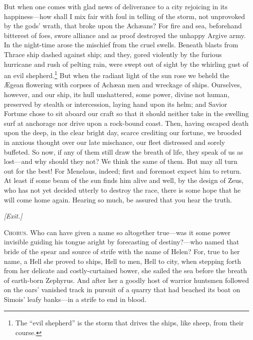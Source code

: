 \documentclass[12pt]{article}
\begin{document}
But when one comes with glad news of deliverance to a city rejoicing in its hap\-pi\-ness---how shall I mix fair with foul in telling of the storm, not unprovoked by the gods' wrath, that broke upon the Ach{\ae}ans? For fire and sea, beforehand bitterest of foes, swore alliance and as proof destroyed the unhappy Argive army. In the night-time arose the mischief from the cruel swells. Beneath blasts from Thrace ship dashed against ship; and they, gored violently by the furious hurricane and rush of pelting rain, were swept out of sight by the whirling gust of an evil shepherd.\footnote{The ``evil shepherd'' is the storm that drives the ships, like sheep, from their course.} But when the radiant light of the sun rose we beheld the {\AE}gean flowering with corpses of Ach{\ae}an men and wreckage of ships. Ourselves, however, and our ship, its hull unshattered, some power, divine not human, preserved by stealth or intercession, laying hand upon its helm; and Savior Fortune chose to sit aboard our craft so that it should neither take in the swelling surf at anchorage nor drive upon a rock-bound coast. Then, having escaped death upon the deep, in the clear bright day, scarce crediting our fortune, we brooded in anxious thought over our late mischance, our fleet distressed and sorely buffeted. So now, if any of them still draw the breath of life, they speak of us as lost---and why should they not? We think the same of them. But may all turn out for the best! For Menelaus, indeed; first and foremost expect him to return. At least if some beam of the sun finds him alive and well, by the design of Zeus, who has not yet decided utterly to destroy the race, there is some hope that he will come home again. Hearing so much, be assured that you hear the truth.

\begin{center}
\textit{[Exit.]}
\end{center}

\textsc{Chorus.} Who can have given a name so altogether true---was it some power invisible guiding his tongue aright by forecasting of destiny?---who named that bride of the spear and source of strife with the name of Helen? For, true to her name, a Hell she proved to ships, Hell to men, Hell to city, when stepping forth from her delicate and costly-curtained bower, she sailed the sea before the breath of earth-born Zephyrus. And after her a goodly host of warrior huntsmen followed on the oars' vanished track in pursuit of a quarry that had beached its boat on Simois' leafy banks---in a strife to end in blood.
\end{document}
